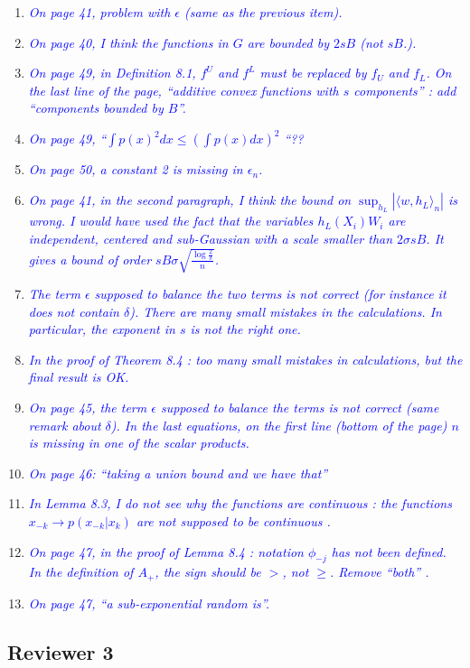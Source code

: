 \documentclass[pdftex,12pt]{article}
\def\rc#1{{\it\textcolor{blue}{#1}}\smallskip}
\begin{document}
\begin{enumerate}
\item \rc{On page 41, problem with $\epsilon$ (same as the previous item).}
\item \rc{On page 40, I think the functions in $G$ are bounded by $2sB$ (not $sB$.).}
\item \rc{On page 49, in Definition 8.1, $f^U$ and $f^L$ must be replaced by $f_U$ and
$f_L$. On the last line of the page, ``additive convex functions with $s$
components'' : add ``components bounded by $B$''.}
\item \rc{On page 49, ``$\int p(x)^2dx \leq (\int p(x)dx)^2$ ``??}
\item \rc{On page 50, a constant 2 is missing in $\epsilon_n$.}
\item \rc{On page 41, in the second paragraph, I think the bound on $\sup_{h_L} |⟨w,h_L⟩_n|$ is
wrong. I would have used the fact that the variables $h_L(X_i) W_i$ are
independent, centered and sub-Gaussian with a scale smaller than
$2\sigma s B$. It gives a bound of order $sB\sigma \sqrt{\frac{\log\frac{2}{\delta}}{n}}$.}
\item \rc{The term $\epsilon$ supposed to balance the two terms is not correct (for
instance it does not contain $\delta$). There are many small mistakes in the
calculations. In particular, the exponent in $s$ is not the right one.}
\item \rc{In the proof of Theorem 8.4 : too many small mistakes in
calculations, but the final result is OK.}
\item \rc{On page 45, the term $\epsilon$ supposed to balance the terms is not correct
(same remark about $\delta$). In the last equations, on the first line (bottom
of the page) $n$ is missing in one of the scalar products.}
\item \rc{On page 46: ``taking a union bound and we have that''}
\item \rc{In Lemma 8.3, I do not see why the functions are continuous : the
functions $x_{-k} \rightarrow p(x_{-k} | x_k)$ are not supposed to be continuous .}
\item \rc{On page 47, in the proof of Lemma 8.4 : notation $\phi_{-j}$
  has not been defined.
In the definition of $A_+$, the sign should be $>$, not $\geq$. Remove ``both'' .}
\item \rc{On page 47, ``a sub-exponential random is''.}

\end{enumerate}

\subsection*{Reviewer 3}
\end{document}
